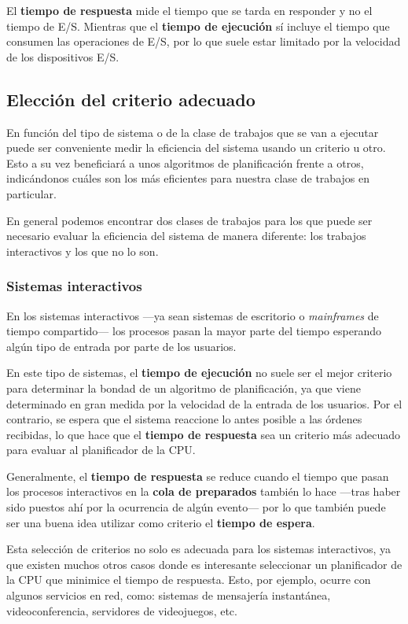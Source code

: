El \textbf{tiempo de respuesta} mide el tiempo que se tarda en responder
y no el tiempo de E/S. Mientras que el \textbf{tiempo de ejecución} sí
incluye el tiempo que consumen las operaciones de E/S, por lo que suele
estar limitado por la velocidad de los dispositivos E/S.

\subsection{Elección del criterio
adecuado}\label{_elecciuxf3n_del_criterio_adecuado}

En función del tipo de sistema o de la clase de trabajos que se van a
ejecutar puede ser conveniente medir la eficiencia del sistema usando un
criterio u otro. Esto a su vez beneficiará a unos algoritmos de
planificación frente a otros, indicándonos cuáles son los más eficientes
para nuestra clase de trabajos en particular.

En general podemos encontrar dos clases de trabajos para los que puede
ser necesario evaluar la eficiencia del sistema de manera diferente: los
trabajos interactivos y los que no lo son.

\subsubsection{Sistemas interactivos}\label{_sistemas_interactivos}

En los sistemas interactivos ---ya sean sistemas de escritorio o
\emph{mainframes} de tiempo compartido--- los procesos pasan la mayor
parte del tiempo esperando algún tipo de entrada por parte de los
usuarios.

En este tipo de sistemas, el \textbf{tiempo de ejecución} no suele ser
el mejor criterio para determinar la bondad de un algoritmo de
planificación, ya que viene determinado en gran medida por la velocidad
de la entrada de los usuarios. Por el contrario, se espera que el
sistema reaccione lo antes posible a las órdenes recibidas, lo que hace
que el \textbf{tiempo de respuesta} sea un criterio más adecuado para
evaluar al planificador de la CPU.

Generalmente, el \textbf{tiempo de respuesta} se reduce cuando el tiempo
que pasan los procesos interactivos en la \textbf{cola de preparados}
también lo hace ---tras haber sido puestos ahí por la ocurrencia de
algún evento--- por lo que también puede ser una buena idea utilizar
como criterio el \textbf{tiempo de espera}.

Esta selección de criterios no solo es adecuada para los sistemas
interactivos, ya que existen muchos otros casos donde es interesante
seleccionar un planificador de la CPU que minimice el tiempo de
respuesta. Esto, por ejemplo, ocurre con algunos servicios en red, como:
sistemas de mensajería instantánea, videoconferencia, servidores de
videojuegos, etc.

